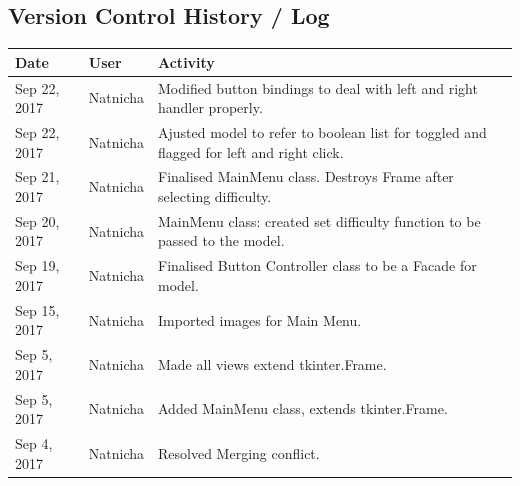 \documentclass[12pt, a4]{report}
\begin{document}
	\subsection{Version Control History / Log}
	\begin{tabular}{ | p{3cm} | p{2cm} | p{11cm} | }
		\hline
		Date & User & Activity \\
		\hline
		Sep 22, 2017 & Natnicha & Modified button bindings to deal with left and right handler properly. \\
		Sep 22, 2017 & Natnicha & Ajusted model to refer to boolean list for toggled and flagged for left and right click. \\
		Sep 21, 2017 & Natnicha & Finalised MainMenu class. Destroys Frame after selecting difficulty. \\
		Sep 20, 2017 & Natnicha & MainMenu class: created set difficulty function to be passed to the model. \\
		Sep 19, 2017 & Natnicha & Finalised Button Controller class to be a Facade for model. \\
		Sep 15, 2017 & Natnicha & Imported images for Main Menu. \\
		Sep 5, 2017 & Natnicha & Made all views extend tkinter.Frame. \\
		Sep 5, 2017 & Natnicha & Added MainMenu class, extends tkinter.Frame. \\ 
		Sep 4, 2017 & Natnicha & Resolved Merging conflict. \\ 
		\hline
	\end{tabular}
\end{document}
